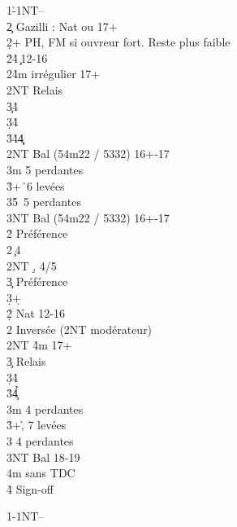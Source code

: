 \documentclass[a4paper]{article}
\begin{document}
\begin{bidtable}
1\h-1NT--\\
2\c \> Gazilli : Nat ou 17+\+\\
2\d {}+ PH, FM si ouvreur fort. Reste plus faible\+\\
2\h {}\h 4\c\ 12-16\\
2\s {}\h 4m irrégulier 17+\+\\
2NT \> Relais\+\\
3\c {}\h 4\c \\
3\d {}\h 4\d \\
3\h {}\h 4\d 4\c \-\-\\
2NT \> Bal (54m22 / 5332) 16+-17\\
3m  5 perdantes\\
3\h {}+\h\ 6 levées\\
3\s {}\h 5\s\ 5 perdantes\\
3NT \> Bal (54m22 / 5332) 16+-17\-\\
2\h \> Préférence\\
2\s {}\c\ 4\d \\
2NT \d , 4/5\c \\
3\c \> Préférence\\
3\d {}+\d \-\\
2\d\h \> Nat 12-16\\
2\s \> Inversée (2NT modérateur)\\
2NT \h 4m 17+\+\\
3\c \> Relais\+\\
3\d {}\h 4\d \\
3\h {}\h 4\c \-\-\\
3m  4 perdantes\\
3\h {}+\h , 7 levées\\
3\s {} 4 perdantes\\
3NT \> Bal 18-19\\
4m  sans TDC\\
4\h \> Sign-off
\end{bidtable}

\begin{bidtable}
1\s-1NT--
\end{bidtable}
\end{document}
